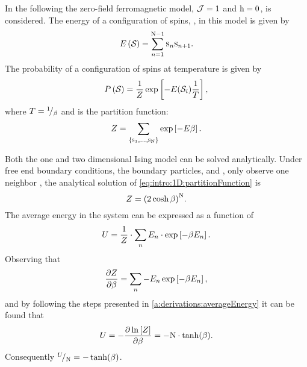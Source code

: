	In the following the zero-field ferromagnetic model, \ie \mbox{$\mathcal{J} = 1$} and \mbox{$\mathrm{h} = 0$},  is considered. The energy \energy of a configuration of spins, \configuration{}, in this model is given by 
	\begin{equation*}
		E\left(\mathcal{S}_{}\right) = \sum_{n = 1}^{\mathrm{N} - 1}\textsc{s}_{n}\textsc{s}_{n+1}.
	\end{equation*}
	The probability of a configuration of spins \configuration{} at temperature \temperature is given by
	\begin{equation}
		\label{eq:intro:1D:configurationProbability}
		P\left(\mathcal{S}_{}\right) = 
		\frac{1}{Z} \exp\left[-{E(\mathcal{S}_{i})}\frac{1}{T}\right],
	\end{equation}
	where $T = {}^{1}\!/_{\beta}$ and \partitionfunction is the partition function:
	\begin{equation}
		\label{eq:intro:1D:partitionFunction}
		Z = \sum_{\left\{\textsc{s}_{1}, \dotsc, \textsc{s}_{\mathrm{N}} \right\}} \exp\left[- E \beta \right].
	\end{equation}

	Both the one and two dimensional Ising model can be solved analytically. Under free end boundary conditions, \ie the boundary particles,  and \spin{\numberOfSpins}, only observe one neighbor \cite{landau2014guide}, the analytical solution of \cref{eq:intro:1D:partitionFunction} is
	\begin{equation}
		\label{eq:introduced1D:partitionFunctionAnalyticalSolution}
		Z = {(2 \cosh \beta)}^\mathrm{N}.
	\end{equation}
	The average energy in the system can be expressed as a function of \partitionfunction \cite{Murray20011Handout}
	\begin{equation*}
		U = \frac{1}{Z} \cdot \sum_{n} E_n \cdot \exp\left[-\beta E_n \right].		
	\end{equation*} 
	Observing that
	\begin{equation*}
		\frac{\partial Z}{\partial \beta} = \sum_{n} - E_n \exp\left[-\beta E_n \right],
	\end{equation*}
	and by following the steps presented in \cref{a:derivations:averageEnergy} it can be found that
	\begin{equation*}
		U = - \frac{\partial \ln \left[ Z \right]}{\partial \beta} = - \mathrm{N} \cdot \tanh (\beta).
	\end{equation*}
	Consequently ${}^{U}\!/_{\mathrm{N}} = - \tanh (\beta)$.

